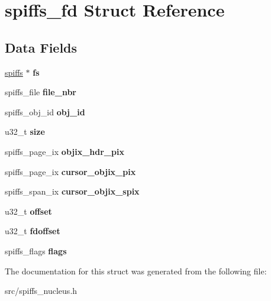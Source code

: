 \hypertarget{structspiffs__fd}{}\section{spiffs\+\_\+fd Struct Reference}
\label{structspiffs__fd}
\subsection*{Data Fields}
\begin{DoxyCompactItemize}
\item 
\mbox{\label{structspiffs__fd_aa21f646ac1a63815a78570700fdb8e91}} 
\mbox{\hyperlink{structspiffs__t}{spiffs}} $\ast$ {\bfseries fs}
\item 
\mbox{\label{structspiffs__fd_a5e8476292713fa8e1519e71b032ada35}} 
spiffs\+\_\+file {\bfseries file\+\_\+nbr}
\item 
\mbox{\label{structspiffs__fd_a056d0dbea7a38ddda491430b83cca4c6}} 
spiffs\+\_\+obj\+\_\+id {\bfseries obj\+\_\+id}
\item 
\mbox{\label{structspiffs__fd_afd4f6ecba84676728fc89441de8acec0}} 
u32\+\_\+t {\bfseries size}
\item 
\mbox{\label{structspiffs__fd_aff20783acee2a6194396450cd09bf1be}} 
spiffs\+\_\+page\+\_\+ix {\bfseries objix\+\_\+hdr\+\_\+pix}
\item 
\mbox{\label{structspiffs__fd_a1c6bc0352d42c68802a7f8163ab90ca7}} 
spiffs\+\_\+page\+\_\+ix {\bfseries cursor\+\_\+objix\+\_\+pix}
\item 
\mbox{\label{structspiffs__fd_ac34aa5584f1f378bb63eaf568c1a6b6e}} 
spiffs\+\_\+span\+\_\+ix {\bfseries cursor\+\_\+objix\+\_\+spix}
\item 
\mbox{\label{structspiffs__fd_a9f017848bfacc49db05c3276e108e3e8}} 
u32\+\_\+t {\bfseries offset}
\item 
\mbox{\label{structspiffs__fd_a761894a2f436b904a8b434f82849ee14}} 
u32\+\_\+t {\bfseries fdoffset}
\item 
\mbox{\label{structspiffs__fd_a20874e5b8a1ca24d4954400e538d0190}} 
spiffs\+\_\+flags {\bfseries flags}
\end{DoxyCompactItemize}


The documentation for this struct was generated from the following file\+:\begin{DoxyCompactItemize}
\item 
src/spiffs\+\_\+nucleus.\+h\end{DoxyCompactItemize}

